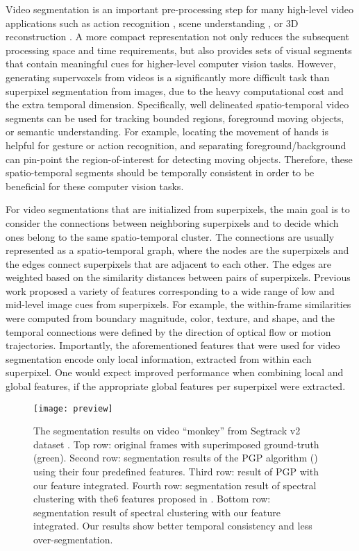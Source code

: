 \documentclass[runningheads]{llncs}
\begin{document}
Video segmentation is an important pre-processing step for many high-level video applications such as action recognition \cite{Taralova2014}, scene understanding \cite{conf/iccv/JainCV13}, or 3D reconstruction \cite{Kundu2014}. A more compact representation not only reduces the subsequent processing space and time requirements, but also provides sets of visual segments that contain meaningful cues for higher-level computer vision tasks. However, generating supervoxels from videos is a significantly more difficult task than superpixel segmentation from images, due to the heavy computational cost and the extra temporal dimension.
Specifically, well delineated spatio-temporal video segments can be used for tracking bounded regions, foreground moving objects, or semantic understanding. For example, locating the movement of hands is helpful for gesture or action recognition, and separating foreground/background can pin-point the region-of-interest for detecting moving objects. Therefore, these spatio-temporal segments should be temporally consistent in order to be beneficial for these computer vision tasks.

For video segmentations that are initialized from superpixels, the main goal is to consider the connections between neighboring superpixels and to decide which ones belong to the same spatio-temporal cluster. The connections are usually represented as a spatio-temporal graph, where the nodes are the superpixels and the edges connect superpixels that are adjacent to each other. The edges are weighted based on the similarity distances between pairs of superpixels. Previous work \cite{Khoreva:7298697,Grundmann:5539893} proposed a variety of features corresponding to a wide range of low and mid-level image cues from superpixels. For example, the within-frame similarities were computed from boundary magnitude, color, texture, and shape, and the temporal connections were defined by the direction of optical flow or motion trajectories.  
Importantly, the aforementioned features that were used for video segmentation encode only local information, extracted from within each superpixel. One would expect improved performance when combining local and global features, if the appropriate global features per superpixel were extracted.

\begin{figure}[!t]
\begin{center}
\texttt{[image: preview]}
\end{center}
\caption{The segmentation results on video ``monkey'' from Segtrack v2 dataset \cite{SegTrackv2_dataset}. Top row: original frames with superimposed ground-truth (green). Second row: segmentation results of the PGP algorithm (\cite{Yu_2015_ICCV}) using their four predefined features. Third row: result of PGP with our feature integrated. Fourth row: segmentation result of spectral clustering with the6 features proposed in \cite{Galasso2013}. Bottom row: segmentation result of spectral clustering with our feature integrated. Our results show better temporal consistency and less over-segmentation.}
\label{fig:preview}
\end{figure}
\end{document}
